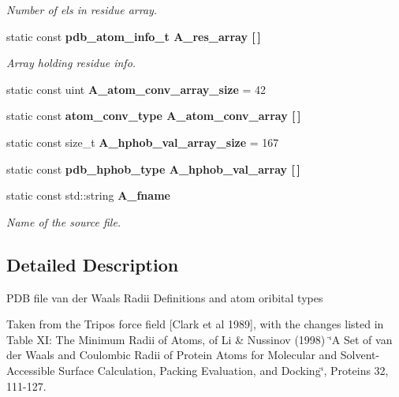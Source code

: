\begin{CompactItemize}
\begin{CompactList}\small\item\em Number of els in residue array. \item\end{CompactList}\item 
static const \bf{pdb\_\-atom\_\-info\_\-t} \bf{A\_\-res\_\-array} [$\,$]\label{classASCbase_1_1PDB__residues_7b64a47671ba736cf508b89f59b17fab}

\begin{CompactList}\small\item\em Array holding residue info. \item\end{CompactList}\item 
static const uint \textbf{A\_\-atom\_\-conv\_\-array\_\-size} = 42\label{classASCbase_1_1PDB__residues_90f14b7d94a4e172f99e1e68c41fa9d5}

\item 
static const \bf{atom\_\-conv\_\-type} \textbf{A\_\-atom\_\-conv\_\-array} [$\,$]\label{classASCbase_1_1PDB__residues_ba8d329e1c656046f504351cf5dbeeda}

\item 
static const size\_\-t \textbf{A\_\-hphob\_\-val\_\-array\_\-size} = 167\label{classASCbase_1_1PDB__residues_e5b8bfbc4c3ea26687e0ca82b1b44d45}

\item 
static const \bf{pdb\_\-hphob\_\-type} \textbf{A\_\-hphob\_\-val\_\-array} [$\,$]\label{classASCbase_1_1PDB__residues_e94cb2cd3cdf8c693adb2a7cddfd98be}

\item 
static const std::string \bf{A\_\-fname}\label{classASCbase_1_1PDB__residues_0b71b0db5fafc2e45019bd1e91f97484}

\begin{CompactList}\small\item\em Name of the source file. \item\end{CompactList}\end{CompactItemize}


\subsection{Detailed Description}
PDB file van der Waals Radii Definitions and atom oribital types

Taken from the Tripos force field [Clark et al 1989], with the changes listed in Table XI: The Minimum Radii of Atoms, of Li \& Nussinov (1998) \char`\"{}A Set of van der Waals and Coulombic Radii of Protein Atoms for Molecular and Solvent-Accessible Surface Calculation, Packing Evaluation, and Docking\char`\"{}, Proteins 32, 111-127.

